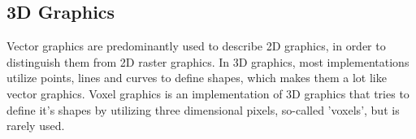 \subsection{3D Graphics}
Vector graphics are predominantly used to describe 2D graphics, in order to distinguish them from 2D raster graphics. 
In 3D graphics, most implementations utilize points, lines and curves to define shapes, which makes them a lot like vector graphics. 
Voxel graphics is an implementation of 3D graphics that tries to define it's shapes by utilizing three dimensional pixels, so-called 'voxels', but is rarely used.